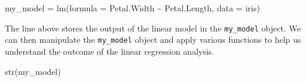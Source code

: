 \documentclass[
  letterpaper,
  DIV=11,
  numbers=noendperiod]{scrreprt}
\newenvironment{Shaded}{\begin{snugshade}}{\end{snugshade}}
\newcommand{\AttributeTok}[1]{\textcolor[rgb]{0.40,0.45,0.13}{#1}}
\newcommand{\FunctionTok}[1]{\textcolor[rgb]{0.28,0.35,0.67}{#1}}
\newcommand{\NormalTok}[1]{\textcolor[rgb]{0.00,0.23,0.31}{#1}}
\newcommand{\OtherTok}[1]{\textcolor[rgb]{0.00,0.23,0.31}{#1}}
\newcommand{\SpecialCharTok}[1]{\textcolor[rgb]{0.37,0.37,0.37}{#1}}
\begin{document}
\begin{Shaded}
\begin{Highlighting}[]
\NormalTok{my\_model }\OtherTok{=} \FunctionTok{lm}\NormalTok{(}\AttributeTok{formula =}\NormalTok{ Petal.Width }\SpecialCharTok{\textasciitilde{}}\NormalTok{ Petal.Length,}
              \AttributeTok{data =}\NormalTok{ iris)}
\end{Highlighting}
\end{Shaded}

The line above stores the output of the linear model in the
\texttt{my\_model} object. We can then manipulate the \texttt{my\_model}
object and apply various functions to help us understand the outcome of
the linear regression analysis.

\begin{Shaded}
\begin{Highlighting}[]
\FunctionTok{str}\NormalTok{(my\_model)}
\end{Highlighting}
\end{Shaded}
\end{document}
